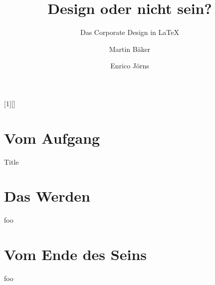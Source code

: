 \documentclass{beamer}
\begin{document}
\title{Design oder nicht sein?}
\subtitle{Das Corporate Design in  LaTeX}
\author{Martin Bäker\and Enrico Jörns}
\titlegraphic{\tuDefaultTitlegraphic}

\begin{frame}[plain]
  \titlepage
\end{frame}

[1][]{%
}

\section{Vom Aufgang}

\begin{frame}[plain]
  \partpage
\end{frame}

\begin{frame}{Title}
  \lipsum[2]
\end{frame}

\section{Das Werden}

\begin{frame}
  \sectionpage
\end{frame}


\begin{frame}
  foo
\end{frame}

\section{Vom Ende des Seins}



\begin{frame}
  foo
\end{frame}



\begin{frame}[plain]
  \sectionpage
\end{frame}
\end{document}
